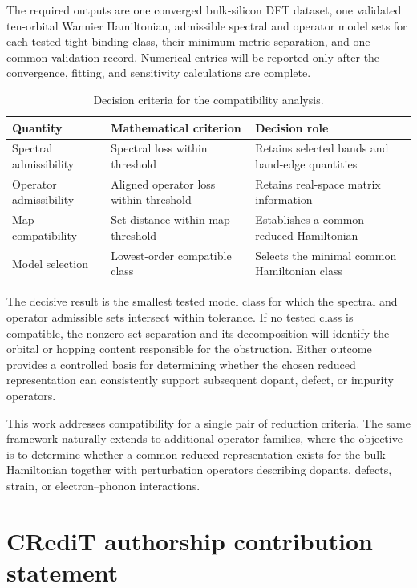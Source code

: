 \documentclass[preprint,12pt]{elsarticle}
\begin{document}
The required outputs are one converged bulk-silicon DFT dataset, one validated
ten-orbital Wannier Hamiltonian, admissible spectral and operator model sets for
each tested tight-binding class, their minimum metric separation, and one
common validation record. Numerical entries will be reported only after the
convergence, fitting, and sensitivity calculations are complete.

\begin{table}[t]
\centering
\caption{Decision criteria for the compatibility analysis.}
\label{tab:decision-criteria}
\begin{tabular}{@{}
>{\raggedright\arraybackslash}p{}
>{\raggedright\arraybackslash}p{}
>{\raggedright\arraybackslash}p{}@{}}
\toprule
Quantity & Mathematical criterion & Decision role \\
\midrule
Spectral admissibility
& Spectral loss within threshold
& Retains selected bands and band-edge quantities \\
Operator admissibility
& Aligned operator loss within threshold
& Retains real-space matrix information \\
Map compatibility
& Set distance within map threshold
& Establishes a common reduced Hamiltonian \\
Model selection
& Lowest-order compatible class
& Selects the minimal common Hamiltonian class \\
\bottomrule
\end{tabular}
\end{table}

The decisive result is the smallest tested model class for which the spectral
and operator admissible sets intersect within tolerance. If no tested class is
compatible, the nonzero set separation and its decomposition will identify the
orbital or hopping content responsible for the obstruction. Either outcome
provides a controlled basis for determining whether the chosen reduced
representation can consistently support subsequent dopant, defect, or impurity
operators.

This work addresses compatibility for a single pair of reduction criteria. The
same framework naturally extends to additional operator families, where the
objective is to determine whether a common reduced representation exists for
the bulk Hamiltonian together with perturbation operators describing dopants,
defects, strain, or electron--phonon interactions.

\section*{CRediT authorship contribution statement}
\end{document}
